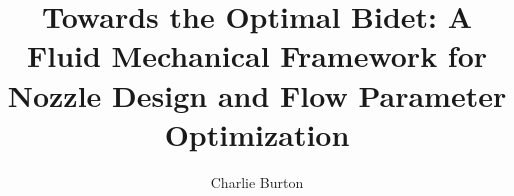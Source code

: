 \documentclass[aps,prfluids,reprint,amsmath,amssymb,floatfix]{revtex4-2}
\begin{document}
\title{Towards the Optimal Bidet: A Fluid Mechanical Framework
  for Nozzle Design and Flow Parameter Optimization}

\author{Charlie Burton}

\end{document}

